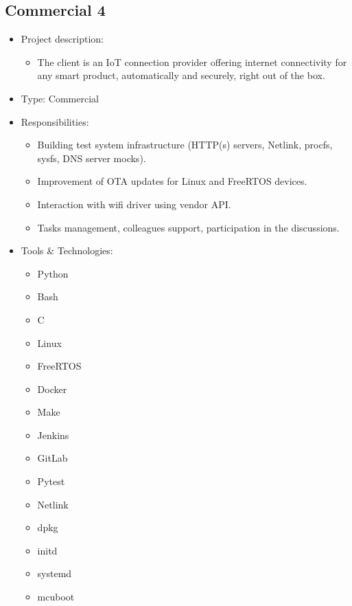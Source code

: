 \hypertarget{proj_com4}{\subsection{Commercial 4}}
\begin{itemize}
    \item Project description:
    \begin{itemize}
        \item The client is an IoT connection provider offering internet connectivity for any smart product,
              automatically and securely, right out of the box.
    \end{itemize}
    \item Type: Commercial
    \item Responsibilities:
    \begin{itemize}
        \item Building test system infrastructure
              (HTTP(s) servers, Netlink, procfs, sysfs, DNS server mocks).
        \item Improvement of OTA updates for Linux and FreeRTOS devices.
        \item Interaction with wifi driver using vendor API.
        \item Tasks management, colleagues support, participation in the discussions.
    \end{itemize}
    \item Tools \& Technologies:
    \begin{itemize}
        \item Python
        \item Bash
        \item C
        \item Linux
        \item FreeRTOS
        \item Docker
        \item Make
        \item Jenkins
        \item GitLab
        \item Pytest
        \item Netlink
        \item dpkg
        \item initd
        \item systemd
        \item mcuboot
    \end{itemize}
\end{itemize}
\newpage

